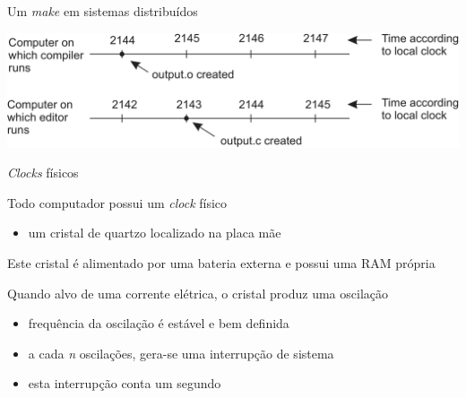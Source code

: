 \documentclass[compress]{beamer}
\begin{document}

\begin{frame}{Um \textit{make} em sistemas distribuídos}

\vspace{0.5cm}

\centering \includegraphics[width=\textwidth]{images/make.png}

\end{frame}


\begin{frame}{\textit{Clocks} físicos}

Todo computador possui um \textit{clock} físico
\begin{itemize}
    \item um cristal de quartzo localizado na placa mãe
\end{itemize}

\vspace{0.5cm}

Este cristal é alimentado por uma bateria externa e possui uma RAM própria

\vspace{0.5cm}

Quando alvo de uma corrente elétrica, o cristal produz uma oscilação
\begin{itemize}
    \item frequência da oscilação é estável e bem definida
    \item a cada \textit{n} oscilações, gera-se uma interrupção de sistema
    \item esta interrupção conta um segundo
\end{itemize}
\end{frame}

\end{document}
